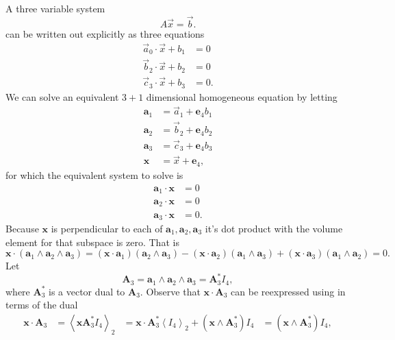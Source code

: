 \documentclass[letterpaper]{scrreprt}
\newcommand{\lr}[1]{\left(#1\right)}
\newcommand{\Ba}[0]{\mathbf{a}}
\newcommand{\Be}[0]{\mathbf{e}}
\newcommand{\Bx}[0]{\mathbf{x}}
\newcommand{\BA}[0]{\mathbf{A}}
\newcommand{\conj}[0]{{*}}
\newcommand{\gpgrade}[2] {{\left\langle{{#1}}\right\rangle}_{#2}}
\newcommand{\gpgradetwo}[1] {\gpgrade{#1}{2}}
\begin{document}
A three variable system
\begin{equation}\label{eqn:hyperwedge:160}
A \vec{x} = \vec{b}.
\end{equation}
can be written out explicitly as three equations
\begin{equation}\label{eqn:hyperwedge:120}
\begin{aligned}
\vec{a}_0 \cdot \vec{x} + b_1 &= 0 \\
\vec{b}_2 \cdot \vec{x} + b_2 &= 0 \\
\vec{c}_3 \cdot \vec{x} + b_3 &= 0.
\end{aligned}
\end{equation}
We can solve an equivalent \( 3 + 1 \) dimensional homogeneous equation by letting
\begin{equation}\label{eqn:hyperwedge:180}
\begin{aligned}
\Ba_1 &= \vec{a}_1 + \Be_4 b_1 \\
\Ba_2 &= \vec{b}_2 + \Be_4 b_2 \\
\Ba_3 &= \vec{c}_3 + \Be_4 b_3 \\
\Bx &= \vec{x} + \Be_4,
\end{aligned}
\end{equation}
for which the equivalent system to solve is
\begin{equation}\label{eqn:hyperwedge:200}
\begin{aligned}
\Ba_1 \cdot \Bx &= 0 \\
\Ba_2 \cdot \Bx &= 0 \\
\Ba_3 \cdot \Bx &= 0.
\end{aligned}
\end{equation}
Because \( \Bx \) is perpendicular to each of \( \Ba_1, \Ba_2, \Ba_3 \) it's dot product with the volume element for that subspace is zero.  That is
\begin{equation}\label{eqn:hyperwedge:220}
\Bx \cdot \lr{ \Ba_1 \wedge \Ba_2 \wedge \Ba_3 }
=
\lr{\Bx \cdot \Ba_1} \lr{ \Ba_2 \wedge \Ba_3 }
-\lr{\Bx \cdot \Ba_2} \lr{ \Ba_1 \wedge \Ba_3 }
+\lr{\Bx \cdot \Ba_3} \lr{ \Ba_1 \wedge \Ba_2 }
= 0.
\end{equation}
Let
\begin{equation}\label{eqn:hyperwedge:240}
\BA_3 = \Ba_1 \wedge \Ba_2 \wedge \Ba_3 = \BA_3^\conj I_4,
\end{equation}
where \( \BA_3^\conj \) is a vector dual to \( \BA_3 \).  Observe that \( \Bx \cdot \BA_3 \) can be reexpressed using in terms of the dual
\begin{equation}\label{eqn:hyperwedge:260}
\begin{aligned}
\Bx \cdot \BA_3
&= \gpgradetwo{ \Bx \BA_3^\conj I_4 }
&=
\Bx \cdot \BA_3^\conj \gpgradetwo{ I_4 } + \lr{ \Bx \wedge \BA_3^\conj } I_4
&=
\lr{ \Bx \wedge \BA_3^\conj } I_4,
\end{aligned}
\end{equation}
\end{document}

